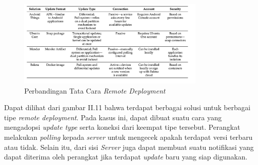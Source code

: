 \begin{figure}[ht]
  \centering
  \includegraphics[width=0.8\textwidth]{resources/chapter-2/perbandingan-remote-deployment.jpg}
  \caption{Perbandingan Tata Cara \textit{Remote Deployment} \parencite{RemoteDeployment}}
  \label{fig:comparison-remote-deployments}
\end{figure}

Dapat dilihat dari gambar II.11 bahwa terdapat berbagai solusi untuk berbagai tipe \textit{remote deployment}. Pada kasus ini, dapat dibuat suatu cara yang mengadopsi \textit{update type} serta koneksi dari keempat tipe tersebut. Perangkat melakukan \textit{polling} kepada \textit{server} untuk mengecek apakah terdapat versi terbaru atau tidak. Selain itu, dari sisi \textit{Server} juga dapat membuat suatu notifikasi yang dapat diterima oleh perangkat jika terdapat \textit{update} baru yang siap digunakan.